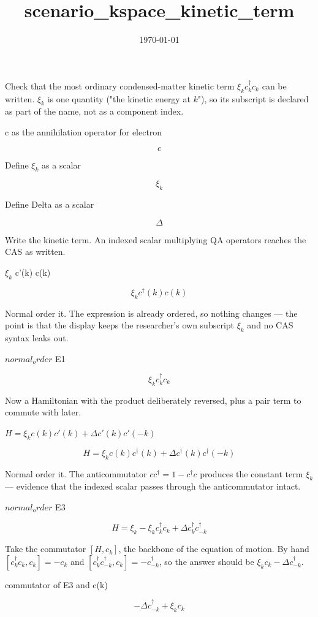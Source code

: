 \documentclass[dvipdfmx]{article}
\title{scenario\_kspace\_kinetic\_term}
\date{\today}
\begin{document}
\maketitle

Check that the most ordinary condensed-matter kinetic term $\xi_k c^\dagger_k c_k$ can be written. $\xi_k$ is one quantity ("the kinetic energy at $k$"), so its subscript is declared as part of the name, not as a component index.

c as the annihilation operator for electron

\[
  c
\]

Define $\xi_{k}$ as a scalar

\[
  \xi_{k}
\]

Define Delta as a scalar

\[
  \Delta
\]

Write the kinetic term. An indexed scalar multiplying QA operators reaches the CAS as written.

$\xi_{k}$ c'(k) c(k)

\begin{equation}
  \xi_{k} c^{\dagger}(k) c(k)
  \label{eq:E1}
\end{equation}

Normal order it. The expression is already ordered, so nothing changes — the point is that the display keeps the researcher's own subscript $\xi_k$ and no CAS syntax leaks out.

$normal_order$ E1

\begin{equation}
  \xi_{k} {c}_{k}^{\dagger} {c}_{k}
  \label{eq:E2}
\end{equation}

Now a Hamiltonian with the product deliberately reversed, plus a pair term to commute with later.

$H = \xi_{k} c(k) c'(k) + \Delta c'(k) c'(-k)$

\begin{equation}
  H = \xi_{k} c(k) c^{\dagger}(k) + \Delta c^{\dagger}(k) c^{\dagger}(-k)
  \label{eq:E3}
\end{equation}

Normal order it. The anticommutator $c c^\dagger = 1 - c^\dagger c$ produces the constant term $\xi_k$ — evidence that the indexed scalar passes through the anticommutator intact.

$normal_order$ E3

\begin{equation}
  H = \xi_{k} -  \xi_{k} c^{\dagger}_{k} c_{k} + \Delta c^{\dagger}_{k} c^{\dagger}_{-k}
  \label{eq:E4}
\end{equation}

Take the commutator $[H, c_k]$, the backbone of the equation of motion. By hand $[c^\dagger_k c_k, c_k]=-c_k$ and $[c^\dagger_k c^\dagger_{-k}, c_k]=-c^\dagger_{-k}$, so the answer should be $\xi_k c_k - \Delta c^\dagger_{-k}$.

commutator of E3 and c(k)

\begin{equation}
  - \Delta c^{\dagger}_{-k} + \xi_{k} c_{k}
  \label{eq:E5}
\end{equation}
\end{document}
